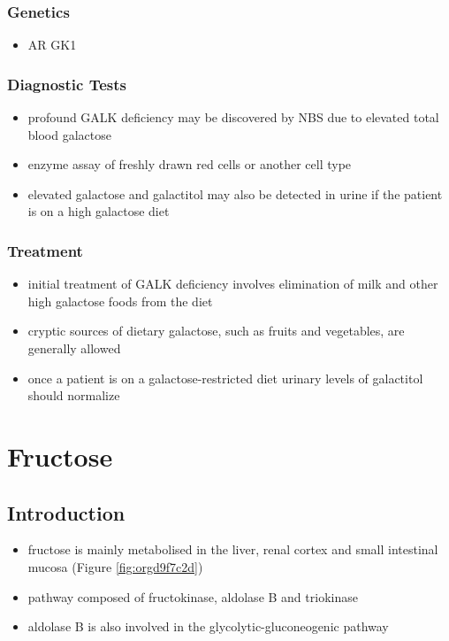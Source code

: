 \documentclass{scrartcl}
\begin{document}
\subsubsection{Genetics}
\label{sec:org90d1f58}
\begin{itemize}
\item AR GK1
\end{itemize}
\subsubsection{Diagnostic Tests}
\label{sec:org5592cc5}
\begin{itemize}
\item profound GALK deficiency may be discovered by NBS due to elevated total blood galactose
\item enzyme assay of freshly drawn red cells or another cell type
\item elevated galactose and galactitol may also be detected in urine if
the patient is on a high galactose diet
\end{itemize}

\subsubsection{Treatment}
\label{sec:org6f8c5f5}
\begin{itemize}
\item initial treatment of GALK deficiency involves elimination of milk
and other high galactose foods from the diet
\item cryptic sources of dietary galactose, such as fruits and vegetables,
are generally allowed
\item once a patient is on a galactose-restricted diet urinary levels of
galactitol should normalize
\end{itemize}
\section{Fructose}
\label{sec:orgf29eacf}
\subsection{Introduction}
\label{sec:orgccc5752}
\begin{itemize}
\item fructose is mainly metabolised in the liver, renal cortex and small
intestinal mucosa (Figure \ref{fig:orgd9f7c2d})
\item pathway composed of fructokinase, aldolase B and triokinase
\item aldolase B is also involved in the glycolytic-gluconeogenic pathway
\end{itemize}
\end{document}
